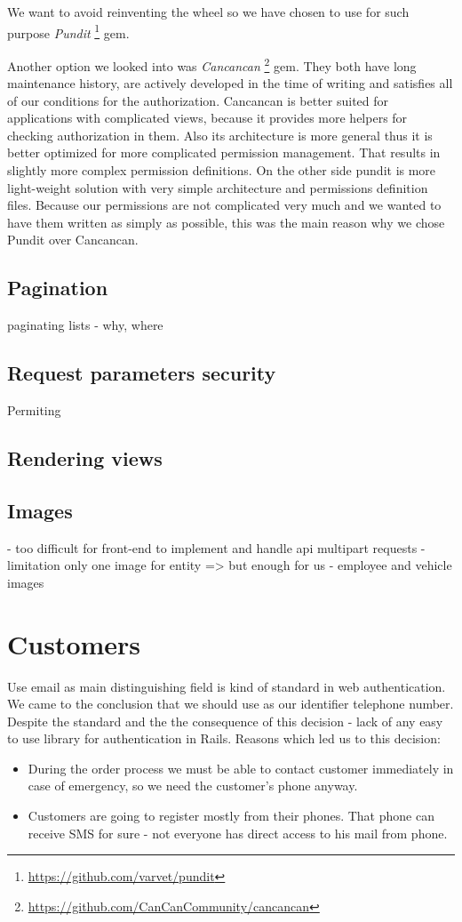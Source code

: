 We want to avoid reinventing the wheel so we have chosen to use for such purpose \textit{Pundit} \footnote{\url{https://github.com/varvet/pundit}} gem. 

Another option we looked into was \textit{Cancancan} \footnote{\url{https://github.com/CanCanCommunity/cancancan}} gem. They both have long maintenance history, are actively developed in the time of writing and satisfies all of our conditions for the authorization. Cancancan is better suited for applications with complicated views, because it provides more helpers for checking authorization in them. Also its architecture is more general thus it is better optimized for more complicated permission management. That results in slightly more complex permission definitions. On the other side pundit is more light-weight solution with very simple architecture and permissions definition files. Because our permissions are not complicated very much and we wanted to have them written as simply as possible, this was the main reason why we chose Pundit over Cancancan.

 \subsection{Pagination}
 paginating lists - why, where
\subsection{Request parameters security}
Permiting

\subsection{Rendering views}

\subsection{Images}
	- too difficult for front-end to implement and handle api multipart requests
	- limitation only one image for entity => but enough for us
	- employee and vehicle images


\section{Customers}
Use email as main distinguishing field is kind of standard in web authentication. We came to the conclusion that we should use as our identifier telephone number. Despite the standard and the the consequence of this decision - lack of any easy to use library for authentication in Rails. Reasons which led us to this decision:
\begin{itemize}
	\item During the order process we must be able to contact customer immediately in case of emergency, so we need the customer's phone anyway.
	\item Customers are going to register mostly from their phones. That phone can receive SMS for sure - not everyone has direct access to his mail from phone. 
\end{itemize}
